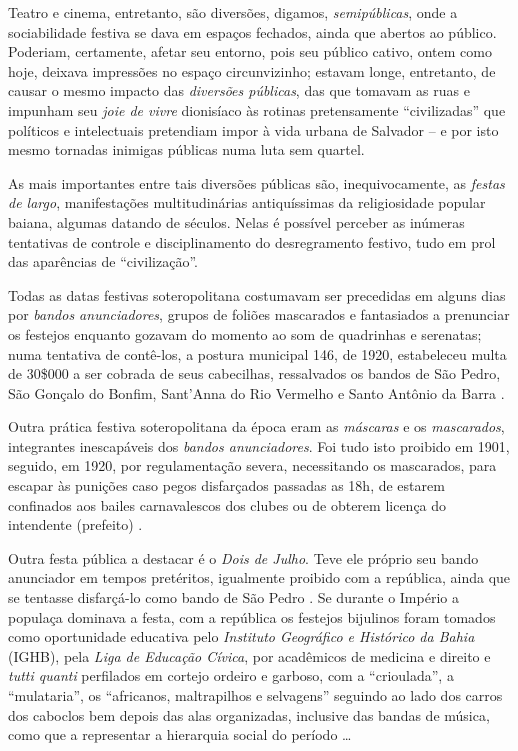

Teatro e cinema, entretanto, são diversões, digamos, \textit{semipúblicas}, onde a sociabilidade festiva se dava em espaços fechados, ainda que abertos ao público. Poderiam, certamente, afetar seu entorno, pois seu público cativo, ontem como hoje, deixava impressões no espaço circunvizinho; estavam longe, entretanto, de causar o mesmo impacto das \textit{diversões públicas}, das que tomavam as ruas e impunham seu \textit{joie de vivre} dionisíaco às rotinas pretensamente ``civilizadas'' que políticos e intelectuais pretendiam impor à vida urbana de Salvador -- e por isto mesmo tornadas inimigas públicas numa luta sem quartel.

As mais importantes entre tais diversões públicas são, inequivocamente, as \textit{festas de largo}, manifestações multitudinárias antiquíssimas da religiosidade popular baiana, algumas datando de séculos. Nelas é possível perceber as inúmeras tentativas de controle e disciplinamento do desregramento festivo, tudo em prol das aparências de ``civilização''.

Todas as datas festivas soteropolitana costumavam ser precedidas em alguns dias por \textit{bandos anunciadores}, grupos de foliões mascarados e fantasiados a prenunciar os festejos enquanto gozavam do momento ao som de quadrinhas e serenatas; numa tentativa de contê-los, a postura municipal 146, de 1920, estabeleceu multa de 30\$000 a ser cobrada de seus cabecilhas, ressalvados os bandos de São Pedro, São Gonçalo do Bonfim, Sant’Anna do Rio Vermelho e Santo Antônio da Barra \cite[pp.~42-43]{albuquerque_doisdejulho_1997}. 

Outra prática festiva soteropolitana da época eram as \textit{máscaras} e os \textit{mascarados}, integrantes inescapáveis dos \textit{bandos anunciadores}. Foi tudo isto proibido em 1901, seguido, em 1920, por regulamentação severa, necessitando os mascarados, para escapar às punições caso pegos disfarçados passadas as 18h, de estarem confinados aos bailes carnavalescos dos clubes ou de obterem licença do intendente (prefeito) \cite[p.~44]{albuquerque_doisdejulho_1997}. 

Outra festa pública a destacar é o \textit{Dois de Julho}. Teve ele próprio seu bando anunciador em tempos pretéritos, igualmente proibido com a república, ainda que se tentasse disfarçá-lo como bando de São Pedro \cite[p.~43]{albuquerque_doisdejulho_1997}. Se durante o Império a populaça dominava a festa, com a república os festejos bijulinos foram tomados como oportunidade educativa pelo \textit{Instituto Geográfico e Histórico da Bahia} (IGHB), pela \textit{Liga de Educação Cívica}, por acadêmicos de medicina e direito e \textit{tutti quanti} perfilados em cortejo ordeiro e garboso, com a ``crioulada'', a ``mulataria'', os ``africanos, maltrapilhos e selvagens'' seguindo ao lado dos carros dos caboclos bem depois das alas organizadas, inclusive das bandas de música, como que a representar a hierarquia social do período \cite[p.~49]{albuquerque_doisdejulho_1997}\dots


